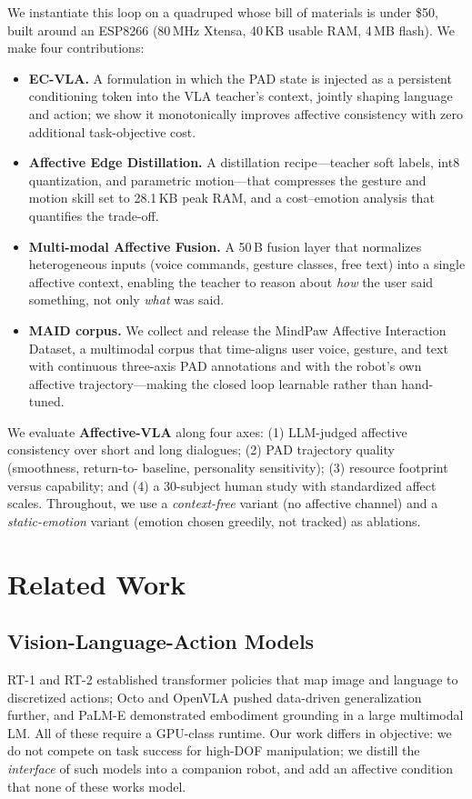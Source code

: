 \documentclass{article}
\newcommand{\method}{\textbf{Affective-VLA}}
\theoremstyle{definition}
\begin{document}
We instantiate this loop on a quadruped whose bill of materials is under \$50,
built around an ESP8266 (80\,MHz Xtensa, 40\,KB usable RAM, 4\,MB flash). We make
four contributions:
\begin{itemize}[nosep,leftmargin=*]
  \item \textbf{EC-VLA.} A formulation in which the PAD state is injected as a
        persistent conditioning token into the VLA teacher's context, jointly
        shaping language and action; we show it monotonically improves affective
        consistency with zero additional task-objective cost.
  \item \textbf{Affective Edge Distillation.} A distillation recipe---teacher
        soft labels, int8 quantization, and parametric motion---that compresses
        the gesture and motion skill set to 28.1\,KB peak RAM, and a
        cost--emotion analysis that quantifies the trade-off.
  \item \textbf{Multi-modal Affective Fusion.} A 50\,B fusion layer that
        normalizes heterogeneous inputs (voice commands, gesture classes, free
        text) into a single affective context, enabling the teacher to reason
        about \emph{how} the user said something, not only \emph{what} was said.
  \item \textbf{MAID corpus.} We collect and release the MindPaw Affective
        Interaction Dataset, a multimodal corpus that time-aligns user voice,
        gesture, and text with continuous three-axis PAD annotations and with
        the robot's own affective trajectory---making the closed loop
        learnable rather than hand-tuned.
\end{itemize}

We evaluate \method{} along four axes: (1) LLM-judged affective consistency over
short and long dialogues; (2) PAD trajectory quality (smoothness, return-to-
baseline, personality sensitivity); (3) resource footprint versus capability;
and (4) a 30-subject human study with standardized affect scales. Throughout, we
use a \emph{context-free} variant (no affective channel) and a \emph{static-emotion}
variant (emotion chosen greedily, not tracked) as ablations.

\section{Related Work}

\subsection{Vision-Language-Action Models}
RT-1 \cite{brohan2022rt1} and RT-2 \cite{brohan2023rt2} established transformer
policies that map image and language to discretized actions; Octo \cite{octo2023}
and OpenVLA \cite{kim2024openvla} pushed data-driven generalization further, and
PaLM-E \cite{driess2023palm_e} demonstrated embodiment grounding in a large
multimodal LM. All of these require a GPU-class runtime. Our work differs in
objective: we do not compete on task success for high-DOF manipulation; we
distill the \emph{interface} of such models into a companion robot, and add an
affective condition that none of these works model.
\end{document}
